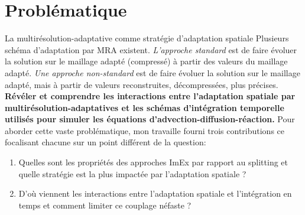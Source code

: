     \section{Problématique}
    \label{par:problematique}
    La multirésolution-adaptative comme stratégie d'adaptation spatiale 
    Plusieurs schéma d'adaptation par MRA existent. 
        \textit{L'approche standard} est de faire évoluer la solution sur le maillage adapté (compressé) à partir des valeurs du maillage adapté.
        \textit{Une approche non-standard} est de faire évoluer la solution sur le maillage adapté, mais à partir de valeurs reconstruites, décompressées, plus précises.
    \textbf{Révéler et comprendre les interactions entre l'adaptation spatiale par multirésolution-adaptatives et les schémas d'intégration temporelle 
    utilisés pour simuler les équations d'advection-diffusion-réaction.}
    Pour aborder cette vaste problématique, mon travaille fourni trois contributions ce focalisant chacune sur un point différent de la question:
    \begin{enumerate}
        \item Quelles sont les propriétés des approches ImEx par rapport au splitting et quelle stratégie est la plus impactée par l'adaptation spatiale ?
        \item D'où viennent les interactions entre l'adaptation spatiale et l'intégration en temps et comment limiter ce couplage néfaste ?
    \end{enumerate}
